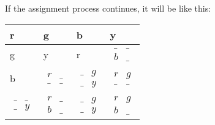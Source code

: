 \documentclass[a4paper]{article}
\begin{document}
If the assignment process continues, it will be like this:\\
\begin{tabular}{|l|l|l|l|}
\hline
r & g & b & y \\ \hline
g & y & r & $\begin{matrix}   \_ & \_ \\   b & \_  \end{matrix}$ \\ \hline
b & $\begin{matrix}   r & \_ \\   \_ & \_  \end{matrix}$ & $\begin{matrix}   \_ & g \\   \_ & y  \end{matrix}$ & $\begin{matrix}   r & g \\   \_ & \_  \end{matrix}$ \\ \hline
$\begin{matrix}   \_ & \_ \\   \_ & y  \end{matrix}$ & $\begin{matrix}   r & \_ \\   b & \_  \end{matrix}$ & $\begin{matrix}   \_ & g \\   \_ & y  \end{matrix}$ & $\begin{matrix}   r & g \\   b & \_  \end{matrix}$ \\ \hline
\end{tabular}\\\\
\end{document}
